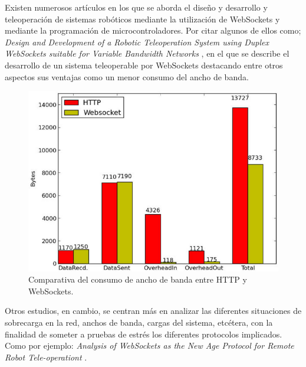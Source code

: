 Existen numerosos artículos en los que se aborda el diseño y desarrollo y teleoperación de sistemas robóticos mediante la utilización de WebSockets y mediante la programación de microcontroladores. Por citar algunos de ellos como; \emph{Design and Development of a Robotic Teleoperation System using
Duplex WebSockets suitable for Variable Bandwidth Networks} \cite{article:1}, en el que se describe el desarrollo de un sistema teleoperable por WebSockets destacando entre otros aspectos sus ventajas como
un menor consumo del ancho de banda.\\
  
\begin{figure}[H]
  \begin{center}
    \includegraphics[scale=0.4]{imagenes/http_websocket_consumo.png}
  \end{center}
  \label{fig:consumos_ancho_banda}
 \caption{ Comparativa del consumo de ancho de banda entre HTTP y WebSockets.}
\end{figure}
  
    
Otros estudios, en cambio, se centran más en analizar las diferentes situaciones de sobrecarga en la red, anchos de banda, cargas del sistema, etcétera, con la finalidad de someter a pruebas de estrés
los diferentes protocolos implicados. Como por ejemplo: \emph{Analysis of WebSockets as the New Age Protocol for Remote Robot Tele-operationt} \cite{article:2}.\\
 
